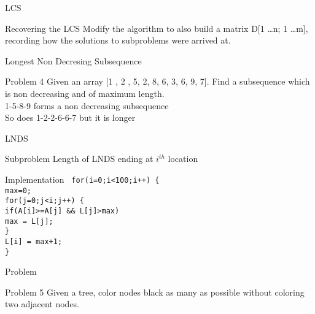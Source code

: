 \documentclass{beamer}
\begin{document}
\begin{frame}{LCS}
  \begin{block}{Recovering the LCS}
    Modify the algorithm to also build a matrix D[1 \dots n; 1 \dots m], recording how the solutions to subproblems were arrived at.
  \end{block}
\end{frame}

\begin{frame}{Longest Non Decresing Subsequence}
  \begin{block}{Problem 4}
    Given an array [1 , 2 , 5, 2, 8, 6, 3, 6, 9, 7]. Find a subsequence which is non decreasing and of maximum length.\\
    \vspace{3mm}
    1-5-8-9 forms a non decreasing subsequence\\
    So does 1-2-2-6-6-7 but it is longer
  \end{block}
\end{frame}

\begin{frame}[<+->]{LNDS}
  \begin{block}{Subproblem}
    Length of LNDS ending at $i^{th}$ location
  \end{block}
  \begin{block}{Implementation}
  \tt{
    for(i=0;i<100;i++) \{\\
      \hspace{2mm} max=0;\\
      \hspace{2mm} for(j=0;j<i;j++) \{\\
	\hspace{5mm} if(A[i]>=A[j] \&\& L[j]>max)\\
	  \hspace{8mm} max = L[j];\\
      \hspace{2mm} \}\\
      \hspace{2mm} L[i] = max+1;\\
    \}
    }
  \end{block}
\end{frame}

\begin{frame}{Problem}
  \begin{block}{Problem 5}
    Given a tree, color nodes black as many as possible without coloring two adjacent nodes.
  \end{block}
\end{frame}
\end{document}
